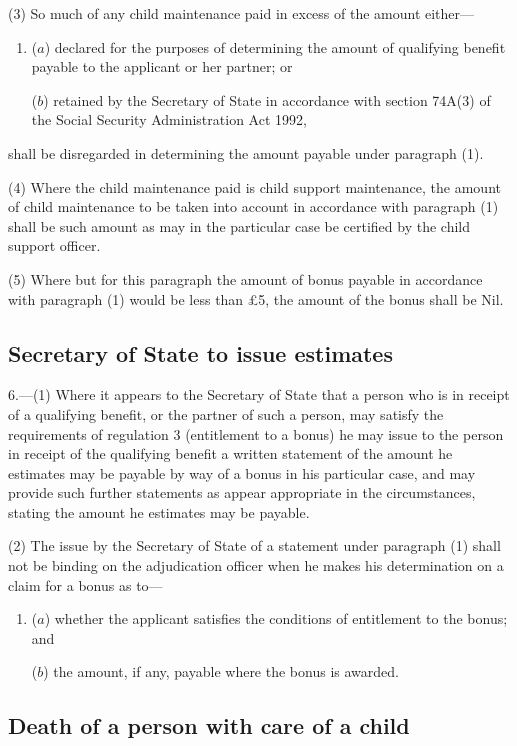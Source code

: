 \documentclass[a4paper]{article}
\begin{document}
(3) So much of any child maintenance paid in excess of the amount either—
\begin{enumerate}\item[]
($a$) declared for the purposes of determining the amount of qualifying benefit payable to the applicant or her partner; or

($b$) retained by the Secretary of State in accordance with section 74A(3) of the Social Security Administration Act 1992,
\end{enumerate}
shall be disregarded in determining the amount payable under paragraph (1).

(4) Where the child maintenance paid is child support maintenance, the amount of child maintenance to be taken into account in accordance with paragraph (1) shall be such amount as may in the particular case be certified by the child support officer.

(5) Where but for this paragraph the amount of bonus payable in accordance with paragraph (1) would be less than £5, the amount of the bonus shall be Nil.

\subsection[6. Secretary of State to issue estimates]{Secretary of State to issue estimates}

6.—(1) Where it appears to the Secretary of State that a person who is in receipt of a qualifying benefit, or the partner of such a person, may satisfy the requirements of regulation 3 (entitlement to a bonus) he may issue to the person in receipt of the qualifying benefit a written statement of the amount he estimates may be payable by way of a bonus in his particular case, and may provide such further statements as appear appropriate in the circumstances, stating the amount he estimates may be payable.

(2) The issue by the Secretary of State of a statement under paragraph (1) shall not be binding on the adjudication officer when he makes his determination on a claim for a bonus as to—
\begin{enumerate}\item[]
($a$) whether the applicant satisfies the conditions of entitlement to the bonus; and

($b$) the amount, if any, payable where the bonus is awarded.
\end{enumerate}

\subsection[7. Death of a person with care of a child]{Death of a person with care of a child}
\end{document}
